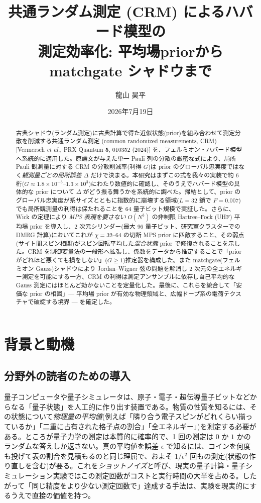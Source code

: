 \documentclass[11pt,a4paper]{ltjsarticle}
\title{\bfseries 共通ランダム測定 (CRM) によるハバード模型の\\測定効率化: 平均場priorから matchgate シャドウまで}
\author{龍山 昊平}
\affil{\normalsize（本稿は数値実験ノートを論文形式にまとめた作業原稿。著者名・所属は適宜編集のこと。）}
\date{2026年7月19日}
\begin{document}
\maketitle

\begin{abstract}
古典シャドウ(ランダム測定)に古典計算で得た近似状態(prior)を組み合わせて測定分散を削減する共通ランダム測定 (common randomized measurements, CRM)[Vermersch \textit{et al.}, PRX Quantum \textbf{5}, 010352 (2024)] を、フェルミオン・ハバード模型へ系統的に適用した。原論文が与えた単一 Pauli 列の分散の厳密な式により、局所 Pauli 観測量に対する CRM の分散削減率(利得 $G$)は prior のグローバル忠実度ではなく\emph{観測量ごとの局所誤差} $\Delta$ だけで決まる。本研究はまずこの式を我々の実装で約 6 桁($G\approx 1.8\times10^{-3}$--$1.3\times10^{3}$)にわたり数値的に確認し、そのうえでハバード模型の具体的な prior について $\Delta$ がどう振る舞うかを系統的に調べた。帰結として、prior のグローバル忠実度が系サイズとともに指数的に崩壊する領域($L=32$ 鎖で $F=0.007$)でも局所観測量の利得は保たれることを 64 量子ビット規模で実証した。さらに、Wick の定理により \emph{MPS 表現を要さない} $O(N^3)$ の非制限 Hartree--Fock (UHF) 平均場 prior を導入し、2 次元シリンダー(最大 96 量子ビット、研究室クラスターでの DMRG 計算)においてこれが $\chi=32$--$64$ の切断 MPS prior に匹敵すること、その弱点(サイト間スピン相関)がスピン回転平均した\emph{混合状態} prior で修復されることを示した。CRM を制御変量法の一般形へ拡張し、係数をデータから推定することで「priorがどれほど悪くても損をしない」($G\ge 1$)推定器を構成した。また matchgate(フェルミオン Gauss)シャドウにより Jordan--Wigner 弦の問題を解消し 2 次元の全エネルギー測定を可能にする一方、CRM の利得は測定アンサンブルに依存し自己平均的な Gauss 測定にはほとんど効かないことを定量化した。最後に、これらを統合して「安価な prior の相図」— 平均場 prior が有効な物理領域と、広幅ドープ系の電荷テクスチャで破綻する境界 — を確定した。
\end{abstract}

\tableofcontents

\section{背景と動機}
\label{sec:intro}

\subsection{分野外の読者のための導入}
\label{sec:primer}
量子コンピュータや量子シミュレータは、原子・電子・超伝導量子ビットなどからなる「量子状態」を人工的に作り出す装置である。物質の性質を知るには、その状態について\emph{物理量の平均値}(例えば「隣り合う電子スピンがどれくらい揃っているか」「二重に占有された格子点の割合」「全エネルギー」)を測定する必要がある。ところが量子力学の測定は本質的に確率的で、1 回の測定は $0$ か $1$ かのランダムな答えしか返さない。真の平均値を誤差 $\epsilon$ で知るには、コインを何度も投げて表の割合を見積もるのと同じ理屈で、およそ $1/\epsilon^2$ 回もの測定(状態の作り直しを含む)が要る。これを\emph{ショットノイズ}と呼び、現実の量子計算・量子シミュレーション実験ではこの測定回数がコストと実行時間の大半を占める。したがって「同じ精度をより少ない測定回数で」達成する手法は、実験を現実的にするうえで直接の価値を持つ。
\end{document}
